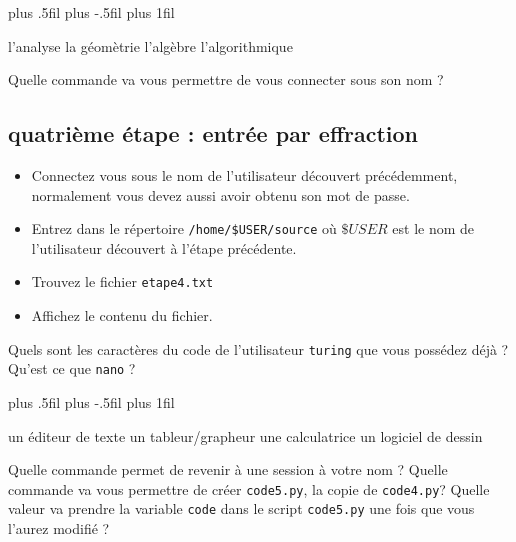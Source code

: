 \documentclass[a4paper,10pt,addpoints]{exam}
\newenvironment{oneparcheckboxescentering}{
	\begingroup
	\leftskip=80mm plus .5fil%
	\rightskip=0mm plus -.5fil%
	\parfillskip=0mm plus 1fil\relax
	\begin{oneparcheckboxes}
	}{
	\end{oneparcheckboxes}
	\par
	\endgroup
}
\begin{document}
\begin{questions}
\begin{oneparcheckboxescentering}
	\choice l'analyse \choice la géomètrie  \choice l'algèbre \choice l'algorithmique 
\end{oneparcheckboxescentering}
\question[1] Quelle commande va vous permettre de vous connecter sous son nom ?
\answerline
\vfill
\subsection{quatrième étape : entrée par effraction}
\begin{itemize}[label=$\leadsto$, font=\LARGE \color{blue}]
	\item Connectez vous sous le nom de l'utilisateur découvert précédemment, normalement vous devez aussi avoir obtenu son mot de passe.
	\item Entrez dans le répertoire \verb|/home/$USER/source| où $\$USER$ est le nom de l'utilisateur découvert à l'étape précédente.
	\item Trouvez le fichier \verb|etape4.txt|
	\item Affichez le contenu du fichier.
\end{itemize}
\question [1] Quels sont les caractères du code de l'utilisateur \verb|turing| que vous possédez déjà ?
\answerline
\question [1] Qu'est ce que \verb|nano| ?
\newline

\begin{oneparcheckboxescentering}
	\choice un éditeur de texte \choice un tableur/grapheur  \choice une calculatrice \choice un logiciel de dessin
\end{oneparcheckboxescentering}
\question [\half] Quelle commande permet de revenir à une session à votre nom ?
\answerline
\question [1] Quelle commande va vous permettre de créer \verb|code5.py|, la copie de \verb|code4.py|?
\answerline
\question [\half] Quelle valeur va prendre la variable \verb|code| dans le script \verb|code5.py| une fois que vous l'aurez modifié ?
\answerline

\end{questions}
\end{document}
